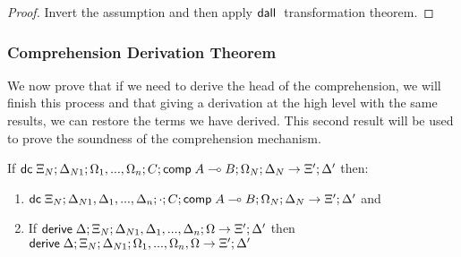 \begin{proof}
   Invert the assumption and then apply $\mathsf{dall} \;$ transformation theorem.
\end{proof}

\subsubsection{Comprehension Derivation Theorem}

We now prove that if we need to derive the head of the comprehension, we will finish this process and that
giving a derivation at the high level with the same results, we can restore the terms we have derived. This second result will be used to prove the soundness of the comprehension mechanism. 

\begin{theorem}
If $\mathsf{dc} \; \Xi_N; \Delta_{N1}; \Omega_1, ..., \Omega_n; C; \mathsf{comp} \; A \multimap B; \Omega_N; \Delta_N \rightarrow \Xi'; \Delta'$ then:
\begin{enumerate}
   \item $\mathsf{dc} \; \Xi_N; \Delta_{N1}, \Delta_1, ..., \Delta_n; \cdot; C; \mathsf{comp} \; A \multimap B; \Omega_N; \Delta_N \rightarrow \Xi'; \Delta'$ and
   \item If $\mathsf{derive} \; \Delta; \Xi_N; \Delta_{N1}, \Delta_1, ..., \Delta_n; \Omega \rightarrow \Xi'; \Delta'$ then $\mathsf{derive} \; \Delta; \Xi_N; \Delta_{N1}; \Omega_1, ..., \Omega_n, \Omega \rightarrow \Xi'; \Delta'$
\end{enumerate}
\end{theorem}

